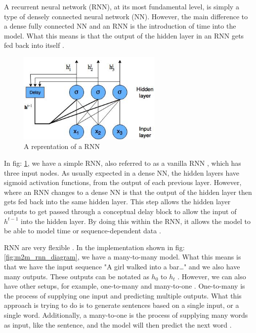 \documentclass[a4paper,10pt]{article}
\begin{document}
	A recurrent neural network (RNN), at its most fundamental level, is simply a type of densely connected neural network (NN). However, the main difference to a dense fully connected NN and an RNN is the introduction of time into the model. What this means is that the output of the hidden layer in an RNN gets fed back into itself \cite{adv_in_ml, geron2019hands}.
	
	\begin{figure}
		\begin{center}
			\includegraphics[width=7cm]{explicit_RNN.jpg}
			\caption{A reprentation of a RNN \cite{adv_in_ml}}
			\label{fig:rnn_diagram}
		\end{center}
	\end{figure} 
	
	In fig: \ref{fig:rnn_diagram}, we have a simple RNN, also referred to as a vanilla RNN \cite{geron2019hands}, which has three input nodes. As usually expected in a dense NN, the hidden layers have sigmoid activation functions, from the output of each previous layer. However, where an RNN changes to a dense NN is that the output of the hidden layer then gets fed back into the same hidden layer. This step allows the hidden layer outputs to get passed through a conceptual delay block to allow the input of $h^{t-1}$ into the hidden layer. By doing this within the RNN, it allows the model to be able to model time or sequence-dependent data \cite{adv_in_ml, geron2019hands}.
	
	RNN are very flexible \cite{geron2019hands}. In the implementation shown in fig: \ref{fig:m2m_rnn_diagram}, we have a many-to-many model. What this means is that we have the input sequence "A girl walked into a bar…" and we also have many outputs. These outputs can be notated as $h_0$ to $h_t$ \cite{adv_in_ml}. However, we can also have other setups, for example, one-to-many and many-to-one \cite{jjslides}.  One-to-many is the process of supplying one input and predicting multiple outputs. What this approach is trying to do is to generate sentences based on a single input, or a single word. Additionally, a many-to-one is the process of supplying many words as input, like the sentence, and the model will then predict the next word \cite{adv_in_ml}.
	
\end{document}
